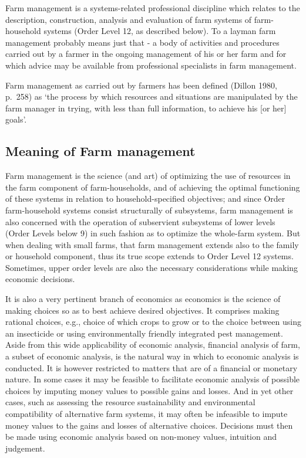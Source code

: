 \documentclass[11pt,]{book}
\theoremstyle{definition}
\theoremstyle{definition}
\theoremstyle{definition}
\theoremstyle{remark}
\begin{document}
Farm management is a systems-related professional discipline which
relates to the description, construction, analysis and evaluation of
farm systems of farm-household systems (Order Level 12, as described
below). To a layman farm management probably means just that - a body of
activities and procedures carried out by a farmer in the ongoing
management of his or her farm and for which advice may be available from
professional specialists in farm management.

Farm management as carried out by farmers has been defined (Dillon 1980,
p.~258) as `the process by which resources and situations are
manipulated by the farm manager in trying, with less than full
information, to achieve his {[}or her{]} goals'.

\subsection{Meaning of Farm
management}\label{meaning-of-farm-management}

Farm management is the science (and art) of optimizing the use of
resources in the farm component of farm-households, and of achieving the
optimal functioning of these systems in relation to household-specified
objectives; and since Order farm-household systems consist structurally
of subsystems, farm management is also concerned with the operation of
subservient subsystems of lower levels (Order Levels below 9) in such
fashion as to optimize the whole-farm system. But when dealing with
small farms, that farm management extends also to the family or
household component, thus its true scope extends to Order Level 12
systems. Sometimes, upper order levels are also the necessary
considerations while making economic decisions.

It is also a very pertinent branch of economics as economics is the
science of making choices so as to best achieve desired objectives. It
comprises making rational choices, e.g., choice of which crops to grow
or to the choice between using an insecticide or using environmentally
friendly integrated pest management. Aside from this wide applicability
of economic analysis, financial analysis of farm, a subset of economic
analysis, is the natural way in which to economic analysis is conducted.
It is however restricted to matters that are of a financial or monetary
nature. In some cases it may be feasible to facilitate economic analysis
of possible choices by imputing money values to possible gains and
losses. And in yet other cases, such as assessing the resource
sustainability and environmental compatibility of alternative farm
systems, it may often be infeasible to impute money values to the gains
and losses of alternative choices. Decisions must then be made using
economic analysis based on non-money values, intuition and judgement.
\end{document}
